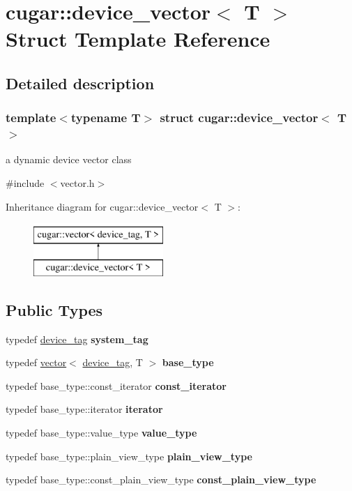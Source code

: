 \hypertarget{structcugar_1_1device__vector}{}\section{cugar\+:\+:device\+\_\+vector$<$ T $>$ Struct Template Reference}
\label{structcugar_1_1device__vector}


\subsection{Detailed description}
\subsubsection*{template$<$typename T$>$\newline
struct cugar\+::device\+\_\+vector$<$ T $>$}

a dynamic device vector class 

{\ttfamily \#include $<$vector.\+h$>$}

Inheritance diagram for cugar\+:\+:device\+\_\+vector$<$ T $>$\+:\begin{figure}[H]
\begin{center}
\leavevmode
\includegraphics[height=2.000000cm]{structcugar_1_1device__vector}
\end{center}
\end{figure}
\subsection*{Public Types}
\begin{DoxyCompactItemize}
\item 
typedef \hyperlink{structcugar_1_1device__tag}{device\+\_\+tag} {\bfseries system\+\_\+tag}
\item 
typedef \hyperlink{structcugar_1_1vector}{vector}$<$ \hyperlink{structcugar_1_1device__tag}{device\+\_\+tag}, T $>$ {\bfseries base\+\_\+type}
\item 
typedef base\+\_\+type\+::const\+\_\+iterator {\bfseries const\+\_\+iterator}
\item 
typedef base\+\_\+type\+::iterator {\bfseries iterator}
\item 
typedef base\+\_\+type\+::value\+\_\+type {\bfseries value\+\_\+type}
\item 
typedef base\+\_\+type\+::plain\+\_\+view\+\_\+type {\bfseries plain\+\_\+view\+\_\+type}
\item 
typedef base\+\_\+type\+::const\+\_\+plain\+\_\+view\+\_\+type {\bfseries const\+\_\+plain\+\_\+view\+\_\+type}
\end{DoxyCompactItemize}
